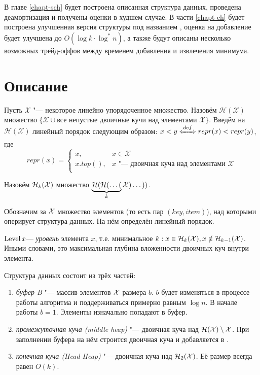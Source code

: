В главе \ref{chapt-sch} будет построена описанная структура данных,
проведена деамортизация и получены оценки в худшем случае.
В части \ref{chapt-ch} будет построена улучшенная версия
структуры под названием \CH,
оценка на добавление будет улучшена до $O(\log k \cdot \log^*n)$,
а также будут описаны несколько возможных трейд-оффов между временем
добавления и извлечения минимума.

\section{Описание}

\begin{definition}
Пусть $\mathcal{X}$ "--- некоторое линейно упорядоченное множество.
Назовём $\mathcal{H}(\mathcal{X})$
множество $\{\mathcal{X} \cup \text{все непустые двоичные кучи над элементами }\mathcal{X}\}$.
Введём на $\mathcal{H}(\mathcal{X})$ линейный порядок следующим образом:
$x < y \xLeftrightarrow{def} repr(x) < repr(y)$, где
\[
repr(x) = \left\lbrace
    \begin{array}{ll}
    x,& x \in \mathcal{X} \\
    x.top(),& x\text{ "--- двоичная куча над элементами }\mathcal{X} \\
    \end{array}
\right.
\]
\end{definition}
\begin{designation}
Назовём $\mathcal{H}_k(\mathcal{X})$ множество $\underbrace{\mathcal{H}(\mathcal{H}(\dots(}_k\mathcal{X})\dots))$.
\end{designation}

Обозначим за $\mathcal{X}$ множество элементов (то есть пар $(key, item)$),
над которыми оперирует структура данных. На нём определён линейный порядок.

\begin{definition}
$\operatorname{Level} x $--- \emph{уровень} элемента $x$, т.е. минимальное $k: x \in \mathcal{H}_k(\mathcal{X}),
x \notin \mathcal{H}_{k-1}(\mathcal{X})$. Иными словами, это максимальная глубина вложенности
двоичных куч внутри элемента.
\end{definition}

Структура данных состоит из трёх частей:
\begin{enumerate}
\item \emph{буфер B} "--- массив элементов $\mathcal{X}$ размера $b$. $b$ будет
изменяться в процессе работы алгоритма и поддерживаться примерно равным $\log n$.
В начале работы $b=1$.
Элементы изначально попадают в буфер.
\item \emph{промежуточная куча \MH (middle heap)} "--- двоичная куча над $\mathcal{H}(\mathcal{X})\setminus\mathcal{X}$.
При заполнении буфера на нём строится двоичная куча и добавляется в \MH.
\item \emph{конечная куча \HH  (Head Heap)} "--- двоичная куча над $\mathcal{H}_2(\mathcal{X})$.
Её размер всегда равен $O(k)$.
\end{enumerate}

